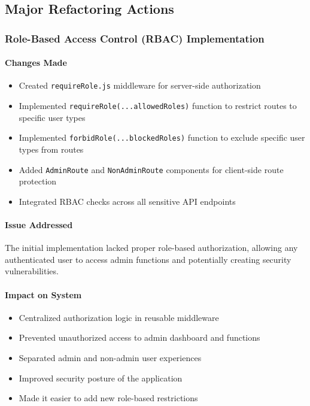 \documentclass[11pt]{article}
\begin{document}
\subsection{Major Refactoring Actions}

\subsubsection{Role-Based Access Control (RBAC) Implementation}
\paragraph{Changes Made}
\begin{itemize}[leftmargin=1.4em]
  \item Created \texttt{requireRole.js} middleware for server-side authorization
  \item Implemented \texttt{requireRole(...allowedRoles)} function to restrict routes to specific user types
  \item Implemented \texttt{forbidRole(...blockedRoles)} function to exclude specific user types from routes
  \item Added \texttt{AdminRoute} and \texttt{NonAdminRoute} components for client-side route protection
  \item Integrated RBAC checks across all sensitive API endpoints
\end{itemize}

\paragraph{Issue Addressed}
The initial implementation lacked proper role-based authorization, allowing any authenticated user to access admin functions and potentially creating security vulnerabilities.

\paragraph{Impact on System}
\begin{itemize}[leftmargin=1.4em]
  \item Centralized authorization logic in reusable middleware
  \item Prevented unauthorized access to admin dashboard and functions
  \item Separated admin and non-admin user experiences
  \item Improved security posture of the application
  \item Made it easier to add new role-based restrictions
\end{itemize}
\end{document}
